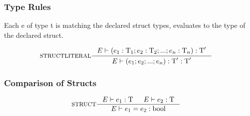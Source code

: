 \subsubsection{Type Rules}

Each e of type t is matching the declared struct types, evaluates to the type of the declared struct.

\begin{align*}
&\inference[STRUCTLITERAL]{\Tenv (e_1 : \Tt_1;e_2 : \Tt_2;...;e_n : \Tt_n):\Tt'}
                 {\Tenv \mathbin{\text{(}} e_1; e_2;...;e_n\mathbin{\text{)}}:\Tt': \Tt'}
\end{align*}

\subsubsection{Comparison of Structs}
\begin{align*}
&\inference[STRUCT]{\Tenv e_1: \Tt & \Tenv e_2: \Tt}
                 {\Tenv e_1 = e_2: \Tbool}
\end{align*}
